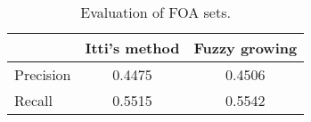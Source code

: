 \begin{table}[t]
\begin{center}
\begin{tabular}{lcc}

\hline
                    &  {\small Itti's method}     & {\small Fuzzy growing}    \\
\hline
{\small Precision}           &  0.4475    & 0.4506 \\
{\small Recall}              &  0.5515    & 0.5542 \\
\hline

\end{tabular}
\caption[Evaluation of FOA sets]{\small Evaluation of FOA sets. } \label{t:FOA}
\end{center}
\end{table}

